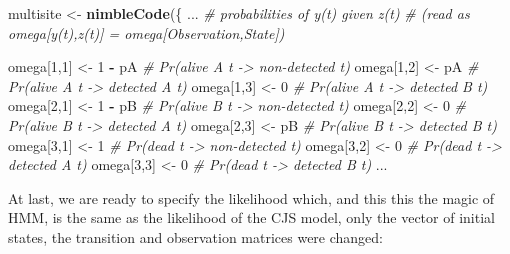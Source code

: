 \documentclass[
  12pt,
]{krantz}
\newenvironment{Shaded}{\begin{snugshade}}{\end{snugshade}}
\newcommand{\CommentTok}[1]{\textcolor[rgb]{0.56,0.35,0.01}{\textit{#1}}}
\newcommand{\DecValTok}[1]{\textcolor[rgb]{0.00,0.00,0.81}{#1}}
\newcommand{\FunctionTok}[1]{\textcolor[rgb]{0.13,0.29,0.53}{\textbf{#1}}}
\newcommand{\NormalTok}[1]{#1}
\newcommand{\OtherTok}[1]{\textcolor[rgb]{0.56,0.35,0.01}{#1}}
\newcommand{\SpecialCharTok}[1]{\textcolor[rgb]{0.81,0.36,0.00}{\textbf{#1}}}
\begin{document}
\begin{Shaded}
\begin{Highlighting}[]
\NormalTok{multisite }\OtherTok{\textless{}{-}} \FunctionTok{nimbleCode}\NormalTok{(\{}
\NormalTok{...}
  \CommentTok{\# probabilities of y(t) given z(t)}
  \CommentTok{\# (read as omega[y(t),z(t)] = omega[Observation,State])}

\NormalTok{  omega[}\DecValTok{1}\NormalTok{,}\DecValTok{1}\NormalTok{] }\OtherTok{\textless{}{-}} \DecValTok{1} \SpecialCharTok{{-}}\NormalTok{ pA     }\CommentTok{\# Pr(alive A t {-}\textgreater{} non{-}detected t)}
\NormalTok{  omega[}\DecValTok{1}\NormalTok{,}\DecValTok{2}\NormalTok{] }\OtherTok{\textless{}{-}}\NormalTok{ pA         }\CommentTok{\# Pr(alive A t {-}\textgreater{} detected A t)}
\NormalTok{  omega[}\DecValTok{1}\NormalTok{,}\DecValTok{3}\NormalTok{] }\OtherTok{\textless{}{-}} \DecValTok{0}          \CommentTok{\# Pr(alive A t {-}\textgreater{} detected B t)}
\NormalTok{  omega[}\DecValTok{2}\NormalTok{,}\DecValTok{1}\NormalTok{] }\OtherTok{\textless{}{-}} \DecValTok{1} \SpecialCharTok{{-}}\NormalTok{ pB     }\CommentTok{\# Pr(alive B t {-}\textgreater{} non{-}detected t)}
\NormalTok{  omega[}\DecValTok{2}\NormalTok{,}\DecValTok{2}\NormalTok{] }\OtherTok{\textless{}{-}} \DecValTok{0}          \CommentTok{\# Pr(alive B t {-}\textgreater{} detected A t)}
\NormalTok{  omega[}\DecValTok{2}\NormalTok{,}\DecValTok{3}\NormalTok{] }\OtherTok{\textless{}{-}}\NormalTok{ pB         }\CommentTok{\# Pr(alive B t {-}\textgreater{} detected B t)}
\NormalTok{  omega[}\DecValTok{3}\NormalTok{,}\DecValTok{1}\NormalTok{] }\OtherTok{\textless{}{-}} \DecValTok{1}          \CommentTok{\# Pr(dead t {-}\textgreater{} non{-}detected t)}
\NormalTok{  omega[}\DecValTok{3}\NormalTok{,}\DecValTok{2}\NormalTok{] }\OtherTok{\textless{}{-}} \DecValTok{0}          \CommentTok{\# Pr(dead t {-}\textgreater{} detected A t)}
\NormalTok{  omega[}\DecValTok{3}\NormalTok{,}\DecValTok{3}\NormalTok{] }\OtherTok{\textless{}{-}} \DecValTok{0}          \CommentTok{\# Pr(dead t {-}\textgreater{} detected B t)}
\NormalTok{...}
\end{Highlighting}
\end{Shaded}

At last, we are ready to specify the likelihood which, and this this the magic of HMM, is the same as the likelihood of the CJS model, only the vector of initial states, the transition and observation matrices were changed:
\end{document}
